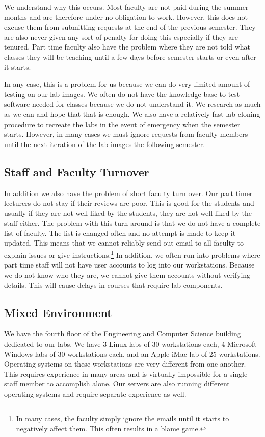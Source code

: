 We understand why this occurs.  Most faculty are not paid during the summer months and are therefore under no obligation to work.  However, this does not excuse them from submitting requests at the end of the previous semester.  They are also never given any sort of penalty for doing this especially if they are tenured.  Part time faculty also have the problem where they are not told what classes they will be teaching until a few days before semester starts or even after it starts.  

In any case, this is a problem for us because we can do very limited amount of testing on our lab images.  We often do not have the knowledge base to test software needed for classes because we do not understand it.  We research as much as we can and hope that that is enough.  We also have a relatively fast lab cloning procedure to recreate the labs in the event of emergency when the semester starts.  However, in many cases we must ignore requests from faculty members until the next iteration of the lab images the following semester.

\subsection{Staff and Faculty Turnover}
In addition we also have the problem of short faculty turn over.  Our part timer lecturers do not stay if their reviews are poor.  This is good for the students and usually if they are not well liked by the students, they are not well liked by the staff either.  The problem with this turn around is that we do not have a complete list of faculty.  The list is changed often and no attempt is made to keep it updated.  This means that we cannot reliably send out email to all faculty to explain issues or give instructions.\footnote{In many cases, the faculty simply ignore the emails until it starts to negatively affect them. This often results in a blame game.}  In addition, we often run into problems where part time staff will not have user accounts to log into our workstations.  Because we do not know who they are, we cannot give them accounts without verifying details.  This will cause delays in courses that require lab components. 

\subsection{Mixed Environment}
We have the fourth floor of the Engineering and Computer Science building dedicated to our labs.  We have 3 Linux labs of 30 workstations each, 4 Microsoft Windows labs of 30 workstations each, and an Apple iMac lab of 25 workstations.  Operating systems on these workstations are very different from one another.  This requires experience in many areas and is virtually impossible for a single staff member to accomplish alone.  Our servers are also running different operating systems and require separate experience as well.  

